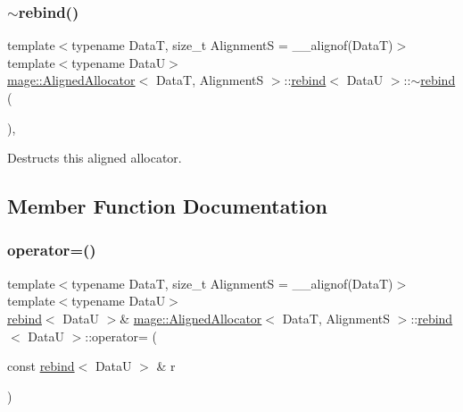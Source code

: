 \subsubsection{\texorpdfstring{$\sim$rebind()}{~rebind()}}
{\footnotesize\ttfamily template$<$typename DataT, size\+\_\+t AlignmentS = \+\_\+\+\_\+alignof(\+Data\+T)$>$ \\
template$<$typename DataU$>$ \\
\hyperlink{structmage_1_1_aligned_allocator}{mage\+::\+Aligned\+Allocator}$<$ DataT, AlignmentS $>$\+::\hyperlink{structmage_1_1_aligned_allocator_1_1rebind}{rebind}$<$ DataU $>$\+::$\sim$\hyperlink{structmage_1_1_aligned_allocator_1_1rebind}{rebind} (\begin{DoxyParamCaption}{ }\end{DoxyParamCaption})\hspace{0.3cm}{\ttfamily [private]}, {\ttfamily [delete]}}

Destructs this aligned allocator. 

\subsection{Member Function Documentation}
\hypertarget{structmage_1_1_aligned_allocator_1_1rebind_a2ce8caabcc8c6bab90e1314c12261a84}{}\label{structmage_1_1_aligned_allocator_1_1rebind_a2ce8caabcc8c6bab90e1314c12261a84} 
\subsubsection{\texorpdfstring{operator=()}{operator=()}\hspace{0.1cm}{\footnotesize\ttfamily [1/2]}}
{\footnotesize\ttfamily template$<$typename DataT, size\+\_\+t AlignmentS = \+\_\+\+\_\+alignof(\+Data\+T)$>$ \\
template$<$typename DataU$>$ \\
\hyperlink{structmage_1_1_aligned_allocator_1_1rebind}{rebind}$<$ DataU $>$\& \hyperlink{structmage_1_1_aligned_allocator}{mage\+::\+Aligned\+Allocator}$<$ DataT, AlignmentS $>$\+::\hyperlink{structmage_1_1_aligned_allocator_1_1rebind}{rebind}$<$ DataU $>$\+::operator= (\begin{DoxyParamCaption}\item[{const \hyperlink{structmage_1_1_aligned_allocator_1_1rebind}{rebind}$<$ DataU $>$ \&}]{r }\end{DoxyParamCaption})\hspace{0.3cm}{\ttfamily [delete]}}

